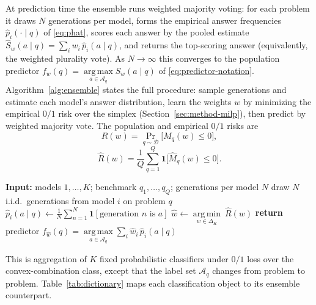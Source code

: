 \documentclass{article} %
\providecommand{\argmax}{\mathop{\mathrm{arg\,max}}\limits}
\providecommand{\argmin}{\mathop{\mathrm{arg\,min}}\limits}
\providecommand{\D}{\mathcal{D}}
\providecommand{\Aq}{\mathcal{A}_q}
\providecommand{\simplex}{\Delta_K}
\providecommand{\Risk}{R}
\providecommand{\eRisk}{\widehat{R}}
\providecommand{\phat}{\widehat{p}}
\providecommand{\Mhat}{\widehat{M}}
\begin{document}
At prediction time the ensemble runs weighted majority voting: for each problem
it draws $N$ generations per model, forms the empirical answer frequencies
$\phat_i(\cdot\mid q)$ of \eqref{eq:phat}, scores each answer by the pooled
estimate $\widehat S_w(a\mid q)=\sum_i w_i\,\phat_i(a\mid q)$, and returns the
top-scoring answer (equivalently, the weighted plurality vote). As $N\to\infty$
this converges to the population predictor
$f_w(q)=\argmax_{a\in\Aq} S_w(a\mid q)$ of \eqref{eq:predictor-notation}.
Algorithm~\ref{alg:ensemble} states the full procedure: sample generations and
estimate each model's answer distribution, learn the weights $w$ by minimizing
the empirical $0/1$ risk over the simplex (Section~\ref{sec:method-milp}), then
predict by weighted majority vote. The population and empirical $0/1$ risks are
\begin{equation}
\label{eq:R}
\Risk(w) = \Pr_{q\sim\D}\!\big[M_q(w)\le 0\big],
\end{equation}
\begin{equation}
\label{eq:Rhat}
\eRisk(w) = \frac1Q\sum_{q=1}^Q \mathbf 1\!\big[\Mhat_q(w)\le 0\big].
\end{equation}


\begin{algorithm}[t]
\caption{Convex-weighted ensemble by majority voting}
\label{alg:ensemble}
\begin{algorithmic}[1]
\STATE \textbf{Input:} models $1,\dots,K$; benchmark $q_1,\dots,q_Q$; generations per model $N$
  \STATE draw $N$ i.i.d.\ generations from model $i$ on problem $q$
  \STATE $\phat_i(a\mid q) \leftarrow \tfrac1N\sum_{n=1}^N \mathbf 1[\text{generation }n\text{ is }a]$ \hfill{}
\ENDFOR
\STATE $\hat w \leftarrow \argmin_{w\in\simplex}\ \eRisk(w)$ \hfill{}
\STATE \textbf{return} predictor $f_{\hat w}(q)=\argmax_{a\in\Aq}\sum_i \hat w_i\,\phat_i(a\mid q)$ \hfill{}
\end{algorithmic}
\end{algorithm}

This is aggregation of $K$ fixed probabilistic classifiers under $0/1$ loss over
the convex-combination class, except that the label set $\Aq$ changes from
problem to problem. Table~\ref{tab:dictionary} maps each classification object to
its ensemble counterpart.
\end{document}
